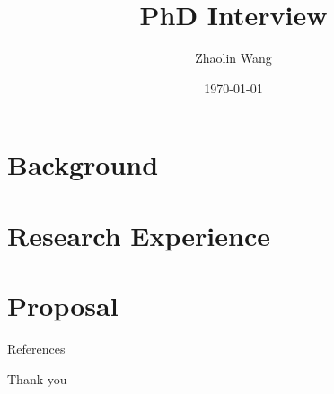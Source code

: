 \documentclass{beamer}
\title[PhD interview]{PhD Interview} %
\author{Zhaolin Wang} %
\institute[Imperial] %
{
Imperial College London \\ %
\medskip
\textit{zhaolin.wang20@imeprial.ac.uk} %
}
\date{\today} %
\begin{document}
\begin{frame}
\titlepage %
\end{frame}



\section{Background}



\section{Research Experience}



\section{Proposal}




\begin{frame}[allowframebreaks]{References}
    \printbibliography
\end{frame}

\begin{frame}
  \Huge{\centerline{Thank you}}
\end{frame}



% 	
%     

% 
% 

\end{document}
